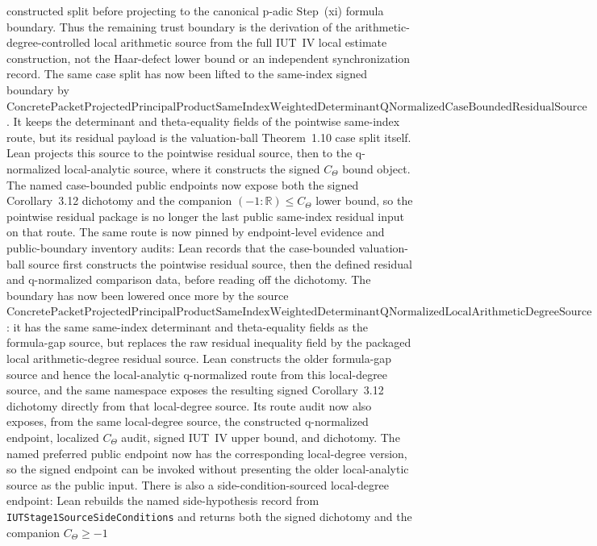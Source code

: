 \documentclass[11pt]{article}
\theoremstyle{plain}
\theoremstyle{definition}
\theoremstyle{remark}
\begin{document}
constructed split before projecting to the canonical p-adic Step~(xi) formula
boundary.
Thus the remaining trust boundary is the derivation of the
arithmetic-degree-controlled local arithmetic source from the full IUT~IV local
estimate construction, not the Haar-defect lower bound or an independent
synchronization record.
The same case split has now been lifted to the same-index signed boundary by
\(\mathrm{ConcretePacketProjectedPrincipalProductSameIndexWeightedDeterminantQNormalizedCaseBoundedResidualSource}\).
It keeps the determinant and theta-equality fields of the pointwise same-index
route, but its residual payload is the valuation-ball Theorem~1.10 case split
itself.  Lean projects this source to the pointwise residual source, then to
the q-normalized local-analytic source, where it constructs the signed
\(C_\Theta\) bound object.  The named case-bounded public endpoints now expose
both the signed Corollary~3.12 dichotomy and the companion
\((-1 : \mathbb{R}) \leq C_\Theta\) lower bound, so the pointwise residual
package is no longer the last public same-index residual input on that route.
The same route is now pinned by endpoint-level evidence and public-boundary
inventory audits: Lean records that the case-bounded valuation-ball source
first constructs the pointwise residual source, then the defined residual and
q-normalized comparison data, before reading off the dichotomy.
The boundary has now been lowered once more by the source
\(\mathrm{ConcretePacketProjectedPrincipalProductSameIndexWeightedDeterminantQNormalizedLocalArithmeticDegreeSource}\):
it has the same same-index determinant and theta-equality fields as the
formula-gap source, but replaces the raw residual inequality field by the
packaged local arithmetic-degree residual source.  Lean constructs the older
formula-gap source and hence the local-analytic q-normalized route from this
local-degree source, and the same namespace exposes the resulting signed
Corollary~3.12 dichotomy directly from that local-degree source.  Its route
audit now also exposes, from the same local-degree source, the constructed
q-normalized endpoint, localized \(C_\Theta\) audit, signed IUT~IV upper
bound, and dichotomy.  The named preferred public endpoint now has the
corresponding local-degree version, so the signed endpoint can be invoked
without presenting the older local-analytic source as the public input.
There is also a side-condition-sourced local-degree endpoint: Lean rebuilds
the named side-hypothesis record from \texttt{IUTStage1SourceSideConditions}
and returns both the signed dichotomy and the companion \(C_\Theta\ge -1\)
\end{document}
